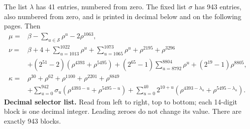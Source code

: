 \documentclass[10pt]{article}
\begin{document}
The list \(\lambda\) has 41 entries, numbered from zero. The fixed list
\(\sigma\) has 943 entries, also numbered from zero, and is printed in
decimal below and on the following pages. Then
\[
\begin{aligned}
\mu={}&\beta-\sum_{u\in\mathcal S}\rho^u-2\rho^{1063},\\
\nu={}&\beta+4+\sum_{u=1013}^{1022}\rho^u+\sum_{u=1065}^{1073}\rho^u
 +\rho^{2195}+\rho^{3296}\\
&+(2^{51}-2)(\rho^{4393}+\rho^{5495})
 +(2^{65}-1)\sum_{u=8792}^{8804}\rho^u+(2^{19}-1)\rho^{8805},\\
\kappa={}&\rho^{30}+\rho^{62}+\rho^{1100}+\rho^{2201}+\rho^{8849}\\
&+\sum_{u=0}^{942}\sigma_u(\rho^{4393-u}+\rho^{5495-u})
 +\sum_{u=0}^{40}2^{10+u}(\rho^{4393-\lambda_u}+\rho^{5495-\lambda_u}).
\end{aligned}
\]
\textbf{Decimal selector list.} Read from left to right, top to bottom;
each 14-digit block is one decimal integer. Leading zeroes do not change its
value. There are exactly 943 blocks.
\end{document}
